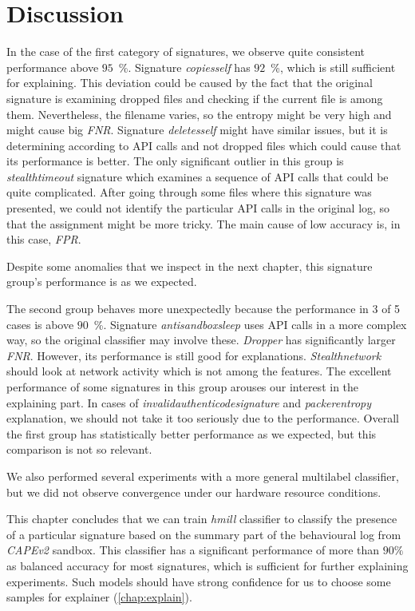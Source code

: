 \section{Discussion}
In the case of the first category of signatures, we observe quite consistent performance above $95$~\%. Signature \emph{copiesself} has $92$~\%, which is still sufficient for explaining. This deviation could be caused by the fact that the original signature is examining dropped files and checking if the current file is among them. Nevertheless, the filename varies, so the entropy might be very high and might cause big \emph{FNR}. Signature \emph{deletesself} might have similar issues, but it is determining according to API calls and not dropped files which could cause that its performance is better. The only significant outlier in this group is \emph{stealthtimeout} signature which examines a sequence of API calls that could be quite complicated. After going through some files where this signature was presented, we could not identify the particular API calls in the original log, so that the assignment might be more tricky. The main cause of low accuracy is, in this case, \emph{FPR}.

Despite some anomalies that we inspect in the next chapter, this signature group's performance is as we expected. 


The second group behaves more unexpectedly because the performance in 3 of 5 cases is above $90$~\%. Signature \emph{antisandboxsleep} uses API calls in a more complex way, so the original classifier may involve these. \emph{Dropper} has significantly larger \emph{FNR}. However, its performance is still good for explanations. \emph{Stealthnetwork} should look at network activity which is not among the features. The excellent performance of some signatures in this group arouses our interest in the explaining part. In cases of \emph{invalidauthenticodesignature} and \emph{packerentropy} explanation, we should not take it too seriously due to the performance. Overall the first group has statistically better performance as we expected, but this comparison is not so relevant.

We also performed several experiments with a more general multilabel classifier, but we did not observe convergence under our hardware resource conditions.

This chapter concludes that we can train \emph{hmill} classifier to classify the presence of a particular signature based on the summary part of the behavioural log from \emph{CAPEv2} sandbox. This classifier has a significant performance of more than $90\%$ as balanced accuracy for most signatures, which is sufficient for further explaining experiments. Such models should have strong confidence for us to choose some samples for explainer (\ref{chap:explain}). 

